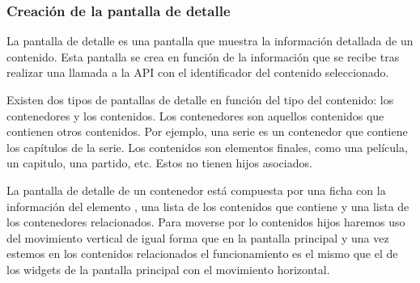 \subsubsection{Creación de la pantalla de detalle}
\label{sec:creacion_pantalla_detalle}

La pantalla de detalle es una pantalla que muestra la información detallada de un contenido. Esta pantalla se crea en función de la información que se 
recibe tras realizar una llamada a la API con el identificador del contenido seleccionado.

Existen dos tipos de pantallas de detalle en función del tipo del contenido: los contenedores y los contenidos. Los contenedores son aquellos contenidos que
contienen otros contenidos. Por ejemplo, una serie es un contenedor que contiene los capítulos de la serie. Los contenidos son elementos finales, como una película,
un capitulo, una partido, etc. Estos no tienen hijos asociados.

La pantalla de detalle de un contenedor está compuesta por una ficha con la información del elemento , una lista de los contenidos que contiene y una lista de los
contenedores relacionados. Para moverse por lo contenidos hijos haremos uso del movimiento vertical de igual forma que en la pantalla principal y una vez estemos 
en los contenidos relacionados el funcionamiento es el mismo que el de los widgets de la pantalla principal con el movimiento horizontal.

